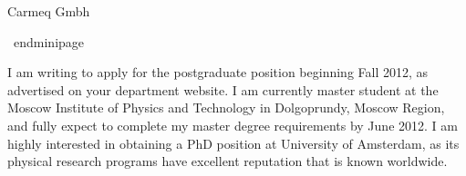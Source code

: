 \documentclass[11pt,a4paper,sans]{article}
\begin{document}
\noindent\begin{minipage}{0.75\textwidth}%
Carmeq Gmbh
\end{minipage}%
\hfill%
\begin{minipage}{0.2\textwidth}\raggedleft

\
end{minipage}

I am writing to apply for the postgraduate position beginning Fall 2012, as advertised on your department website. I am currently master student at the Moscow Institute of Physics and Technology in Dolgoprundy, Moscow Region, and fully expect to complete my master degree requirements by June 2012. I am highly interested in obtaining a PhD position at University of Amsterdam, as its physical research programs have excellent reputation that is known worldwide.




\end{minipage}
\end{document}
